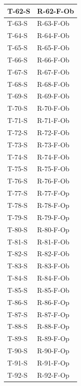 \documentclass[a4paper,12pt]{article}
\begin{document}
{{\begin{longtable}{|
                    >{\centering\arraybackslash}p{}|
                    >{\centering\arraybackslash}p{}|
                }
                T-62-S & R-62-F-Ob \\ \hline
                T-63-S & R-63-F-Ob \\ \hline
                T-64-S & R-64-F-Ob \\ \hline
                T-65-S & R-65-F-Ob \\ \hline
                T-66-S & R-66-F-Ob \\ \hline
                T-67-S & R-67-F-Ob \\ \hline
                T-68-S & R-68-F-Ob \\ \hline
                T-69-S & R-69-F-Ob \\ \hline
                T-70-S & R-70-F-Ob \\ \hline
                T-71-S & R-71-F-Ob \\ \hline
                T-72-S & R-72-F-Ob \\ \hline
                T-73-S & R-73-F-Ob \\ \hline
                T-74-S & R-74-F-Ob \\ \hline
                T-75-S & R-75-F-Ob \\ \hline
                T-76-S & R-76-F-Ob \\ \hline
                T-77-S & R-77-F-Op \\ \hline
                T-78-S & R-78-F-Op \\ \hline
                T-79-S & R-79-F-Op \\ \hline
                T-80-S & R-80-F-Op \\ \hline
                T-81-S & R-81-F-Ob \\ \hline
                T-82-S & R-82-F-Ob \\ \hline
                T-83-S & R-83-F-Ob \\ \hline
                T-84-S & R-84-F-Ob \\ \hline
                T-85-S & R-85-F-Ob \\ \hline
                T-86-S & R-86-F-Op \\ \hline
                T-87-S & R-87-F-Op \\ \hline
                T-88-S & R-88-F-Op \\ \hline
                T-89-S & R-89-F-Op \\ \hline
                T-90-S & R-90-F-Op \\ \hline
                T-91-S & R-91-F-Op \\ \hline
                T-92-S & R-92-F-Op \\ \hline

\end{longtable}}}
\end{document}

